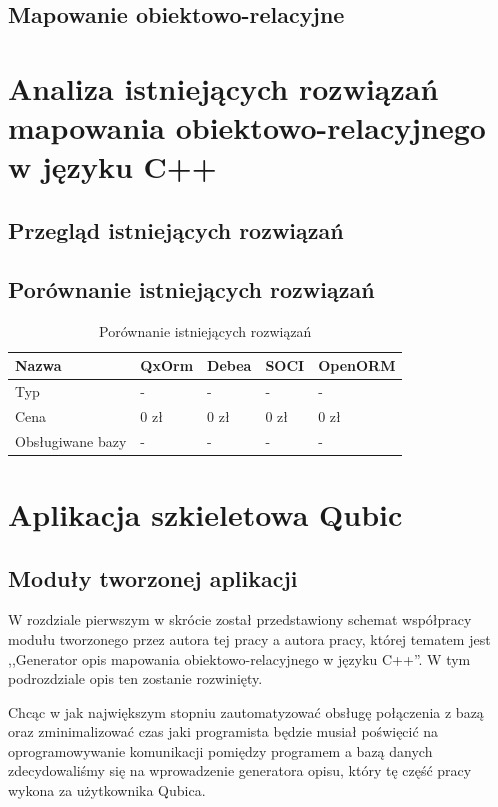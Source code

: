 \documentclass[12pt]{report}
\begin{document}
\section{Mapowanie obiektowo-relacyjne}

\chapter[Analiza istniejących rozwiązań]{Analiza istniejących rozwiązań mapowania obiektowo-relacyjnego w języku C++}
\label{analiza}

\section{Przegląd istniejących rozwiązań}

\section{Porównanie istniejących rozwiązań}

\begin{table}[h]
\centering
\begin{tabular}{| l | l | l | l | l |} 
\hline 
Nazwa & QxOrm & Debea & SOCI & OpenORM \\ \hline
Typ & - & - & - & - \\ \hline
Cena & 0 zł & 0 zł & 0 zł & 0 zł \\ \hline
Obsługiwane bazy & - & - & - & -  \\ \hline
\end{tabular} 
\caption{Porównanie istniejących rozwiązań}
\end{table}

\chapter{Aplikacja szkieletowa Qubic}
\label{qubic}

\section{Moduły tworzonej aplikacji}

W rozdziale pierwszym w skrócie został przedstawiony schemat współpracy modułu tworzonego przez autora tej pracy a autora pracy, której tematem jest ,,Generator opis
mapowania obiektowo-relacyjnego w języku C++''. W tym podrozdziale opis ten zostanie rozwinięty.

Chcąc w jak największym stopniu zautomatyzować obsługę połączenia z bazą oraz zminimalizować czas jaki programista będzie musiał poświęcić na oprogra\-mowywanie
komunikacji pomiędzy programem a bazą danych zdecydowaliśmy się na wprowadzenie generatora opisu, który tę część pracy wykona za użytkownika Qubica.
\end{document}
